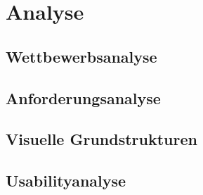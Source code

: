 \chapter{Analyse}
\label{ch:analysis}

\section{Wettbewerbsanalyse}
\label{sec:competitionanalysis}


\section{Anforderungsanalyse}
\label{sec:requirementanalysis}

\section{Visuelle Grundstrukturen}
\label{sec:visualstructure}


\section{Usabilityanalyse}
\label{sec:usabilityanalysis}
